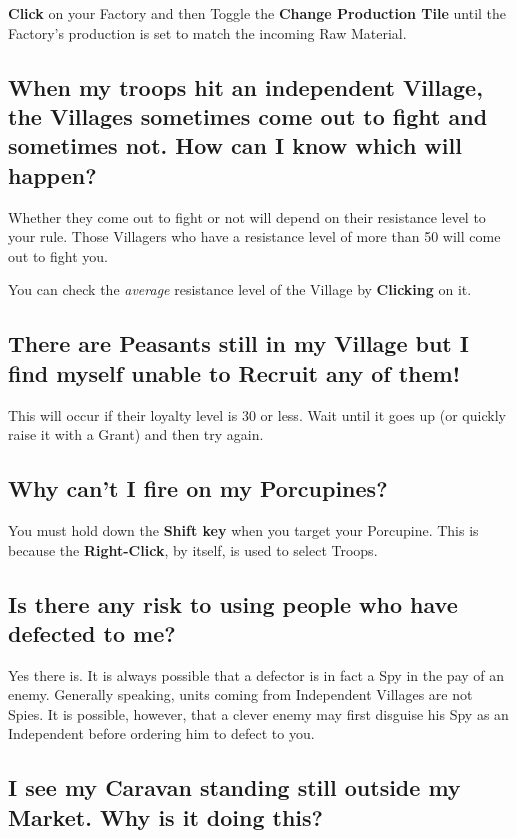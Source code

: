 \textbf{Click} on your Factory and then Toggle the \textbf{Change Production Tile} until the Factory’s production is set to match the incoming Raw Material.

\subsection{When my troops hit an independent Village, the Villages sometimes come out to fight and sometimes not. How can I know which will happen?}

Whether they come out to fight or not will depend on their resistance level to your rule. Those Villagers who have a resistance level of more than 50 will come out to fight you.

You can check the \textit{average} resistance level of the Village by \textbf{Clicking} on it.

\subsection{There are Peasants still in my Village but I find myself unable to Recruit any of them!}

This will occur if their loyalty level is 30 or less. Wait until it goes up (or quickly raise it with a Grant) and then try again.

\subsection{Why can’t I fire on my Porcupines?}


You must hold down the \textbf{Shift key} when you target your Porcupine. This is because the \textbf{Right-Click}, by itself, is used to select Troops.

\subsection{Is there any risk to using people who have defected to me?}

Yes there is. It is always possible that a defector is in fact a Spy in the pay of an enemy. Generally speaking, units coming from Independent Villages are not Spies. It is possible, however, that a clever enemy may first disguise his Spy as an Independent before ordering him to defect to you.

\subsection{I see my Caravan standing still outside my Market. Why is it doing this?}

